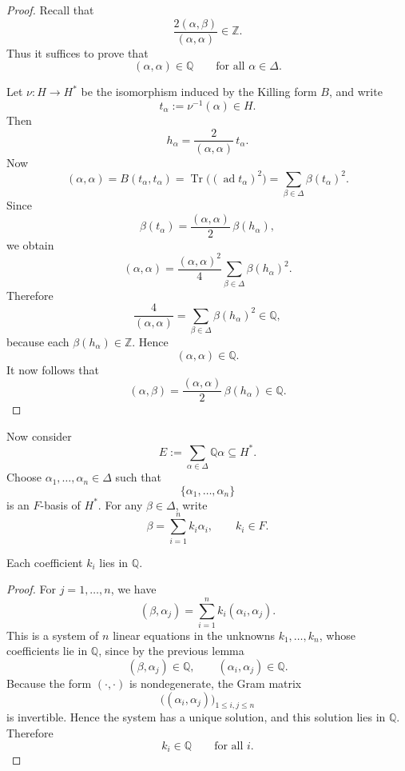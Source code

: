 \begin{proof}
    Recall that
    \[
        \frac{2(\alpha,\beta)}{(\alpha,\alpha)}\in \mathbb{Z}.
    \]
    Thus it suffices to prove that
    \[
        (\alpha,\alpha)\in \mathbb{Q}
        \qquad
        \text{for all }\alpha\in \Delta.
    \]

    Let \(\nu:H\to H^*\) be the isomorphism induced by the Killing form \(B\), and
    write
    \[
        t_\alpha:=\nu^{-1}(\alpha)\in H.
    \]
    Then
    \[
        h_\alpha=\frac{2}{(\alpha,\alpha)}\,t_\alpha.
    \]
    Now
    \[
        (\alpha,\alpha)
        =
        B(t_\alpha,t_\alpha)
        =
        \operatorname{Tr}\!\bigl((\operatorname{ad}t_\alpha)^2\bigr)
        =
        \sum_{\beta\in\Delta}\beta(t_\alpha)^2.
    \]
    Since
    \[
        \beta(t_\alpha)=\frac{(\alpha,\alpha)}{2}\,\beta(h_\alpha),
    \]
    we obtain
    \[
        (\alpha,\alpha)
        =
        \frac{(\alpha,\alpha)^2}{4}
        \sum_{\beta\in\Delta}\beta(h_\alpha)^2.
    \]
    Therefore
    \[
        \frac{4}{(\alpha,\alpha)}
        =
        \sum_{\beta\in\Delta}\beta(h_\alpha)^2
        \in \mathbb{Q},
    \]
    because each \(\beta(h_\alpha)\in \mathbb{Z}\). Hence
    \[
        (\alpha,\alpha)\in \mathbb{Q}.
    \]
    It now follows that
    \[
        (\alpha,\beta)
        =
        \frac{(\alpha,\alpha)}{2}\,\beta(h_\alpha)\in \mathbb{Q}.
    \]
\end{proof}

Now consider
\[
    E:=\sum_{\alpha\in\Delta}\mathbb{Q}\alpha \subseteq H^*.
\]
Choose \(\alpha_1,\dots,\alpha_n\in \Delta\) such that
\[
    \{\alpha_1,\dots,\alpha_n\}
\]
is an \(F\)-basis of \(H^*\). For any \(\beta\in \Delta\), write
\[
    \beta=\sum_{i=1}^n k_i\alpha_i,
    \qquad
    k_i\in F.
\]

\begin{lemma}
    Each coefficient \(k_i\) lies in \(\mathbb{Q}\).
\end{lemma}

\begin{proof}
    For \(j=1,\dots,n\), we have
    \[
        (\beta,\alpha_j)=\sum_{i=1}^n k_i(\alpha_i,\alpha_j).
    \]
    This is a system of \(n\) linear equations in the unknowns \(k_1,\dots,k_n\),
    whose coefficients lie in \(\mathbb{Q}\), since by the previous lemma
    \[
        (\beta,\alpha_j)\in\mathbb{Q},
        \qquad
        (\alpha_i,\alpha_j)\in\mathbb{Q}.
    \]
    Because the form \((\cdot,\cdot)\) is nondegenerate, the Gram matrix
    \[
        \bigl((\alpha_i,\alpha_j)\bigr)_{1\le i,j\le n}
    \]
    is invertible. Hence the system has a unique solution, and this solution lies in
    \(\mathbb{Q}\). Therefore
    \[
        k_i\in \mathbb{Q}
        \qquad
        \text{for all }i.
    \]
\end{proof}

